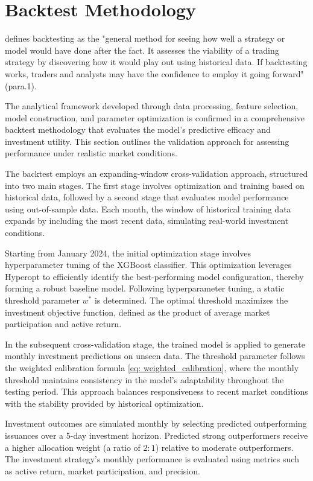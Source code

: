 \section{Backtest Methodology}

\textcite{Chen2024BacktestingDownsides} defines backtesting as the "general method for seeing how well a strategy or model would have done after the fact. It assesses the viability of a trading strategy by discovering how it would play out using historical data. If backtesting works, traders and analysts may have the confidence to employ it going forward" (para.1).

The analytical framework developed through data processing, feature selection, model construction, and parameter optimization is confirmed in a comprehensive backtest methodology that evaluates the model's predictive efficacy and investment utility. This section outlines the validation approach for assessing performance under realistic market conditions.

The backtest employs an expanding-window cross-validation approach, structured into two main stages. The first stage involves optimization and training based on historical data, followed by a second stage that evaluates model performance using out-of-sample data. Each month, the window of historical training data expands by including the most recent data, simulating real-world investment conditions.

Starting from January 2024, the initial optimization stage involves hyperparameter tuning of the XGBoost classifier. This optimization leverages Hyperopt to efficiently identify the best-performing model configuration, thereby forming a robust baseline model. Following hyperparameter tuning, a static threshold parameter $w^*$ is determined. The optimal threshold maximizes the investment objective function, defined as the product of average market participation and active return.

In the subsequent cross-validation stage, the trained model is applied to generate monthly investment predictions on unseen data. The threshold parameter follows the weighted calibration formula \ref{eq: weighted_calibration}, where the monthly threshold maintains consistency in the model's adaptability throughout the testing period. This approach balances responsiveness to recent market conditions with the stability provided by historical optimization.

Investment outcomes are simulated monthly by selecting predicted outperforming issuances over a 5-day investment horizon. Predicted strong outperformers receive a higher allocation weight (a ratio of $2:1$) relative to moderate outperformers. The investment strategy's monthly performance is evaluated using metrics such as active return, market participation, and precision.

